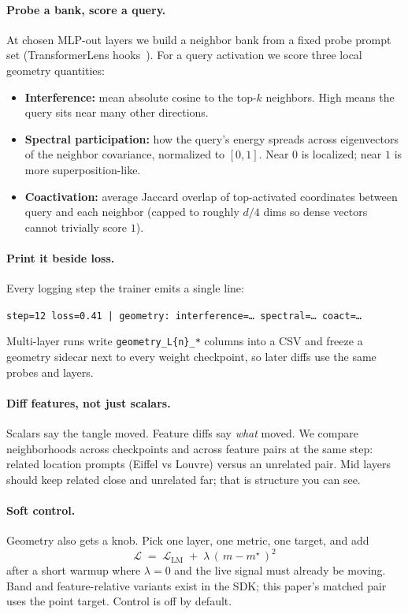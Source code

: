 \documentclass[11pt]{article}
\begin{document}
\paragraph{Probe a bank, score a query.}
At chosen MLP-out layers we build a neighbor bank from a fixed probe prompt
set (TransformerLens hooks~\cite{nanda2022transformerlens}). For a query
activation we score three local geometry quantities:

\begin{itemize}
  \item \textbf{Interference:} mean absolute cosine to the top-$k$
  neighbors. High means the query sits near many other directions.
  \item \textbf{Spectral participation:} how the query's energy spreads
  across eigenvectors of the neighbor covariance, normalized to $[0,1]$.
  Near $0$ is localized; near $1$ is more superposition-like.
  \item \textbf{Coactivation:} average Jaccard overlap of top-activated
  coordinates between query and each neighbor (capped to roughly $d/4$ dims
  so dense vectors cannot trivially score $1$).
\end{itemize}

\paragraph{Print it beside loss.}
Every logging step the trainer emits a single line:
\begin{center}
\texttt{step=12  loss=0.41  |  geometry: interference=\ldots\ spectral=\ldots\ coact=\ldots}
\end{center}
Multi-layer runs write \texttt{geometry\_L\{n\}\_*} columns into a CSV and
freeze a geometry sidecar next to every weight checkpoint, so later diffs use
the same probes and layers.

\paragraph{Diff features, not just scalars.}
Scalars say the tangle moved. Feature diffs say \emph{what} moved. We compare
neighborhoods across checkpoints and across feature pairs at the same step:
related location prompts (Eiffel vs Louvre) versus an unrelated pair. Mid
layers should keep related close and unrelated far; that is structure you can
see.

\paragraph{Soft control.}
Geometry also gets a knob. Pick one layer, one metric, one target, and add
\[
\mathcal{L} \;=\; \mathcal{L}_{\mathrm{LM}}
  \;+\; \lambda\,(\,m - m^\star\,)^2
\]
after a short warmup where $\lambda{=}0$ and the live signal must already be
moving. Band and feature-relative variants exist in the SDK; this paper's
matched pair uses the point target. Control is off by default.
\end{document}
